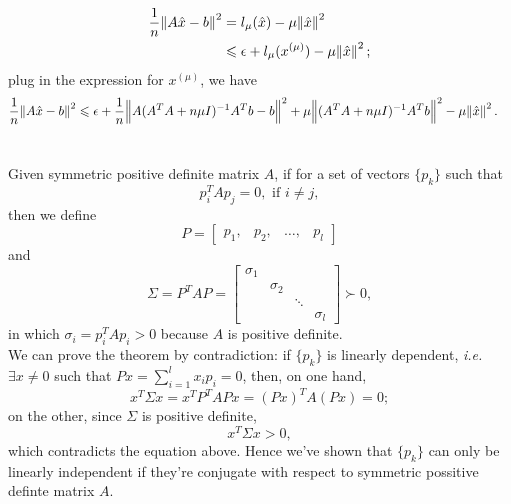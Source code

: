 \documentclass[11pt]{article}
\begin{document}
\subsection{}
\begin{equation}\begin{split}
\frac1n\norm{A\hat x-b}^2 &= l_{\mu}(\hat x)-\mu\norm{\hat x}^2 \\
&\leqslant \epsilon+l_{\mu}(x^{(\mu)})- \mu\norm{\hat x}^2;
\end{split}\nonumber\end{equation}
plug in the expression for $x^{(\mu)}$, we have
\begin{equation}\begin{split} 
\frac1n\norm{A\hat x - b}^2 &\leqslant \epsilon +\frac1n \norm{A(A^TA+n\mu I)^{-1}A^Tb-b}^2+\mu\norm{(A^TA+n\mu I)^{-1}A^Tb}^2-\mu\norm{\hat x}^2.
\end{split}\nonumber\end{equation} 


\section{}
Given symmetric positive definite matrix $A$, if for a set of vectors $\{p_k\}$ such that
$$p_i^TAp_j=0,\,\,\text{if}\,\,i\neq j,$$
then we define
$$P = \begin{bmatrix} p_1, & p_2, & \dots ,& p_l\end{bmatrix} $$
and
$$\Sigma = P^TAP = \begin{bmatrix} \sigma_1 \\ & \sigma_2 \\ & & \ddots \\ & & & \sigma_l \end{bmatrix}\succ0, $$
in which $\sigma_i = p_i^TAp_i > 0$ because $A$ is positive definite.\\[0.4cm]
We can prove the theorem by contradiction: if $\{p_k\}$ is linearly dependent, \textit{i.e.} $\exists x \neq 0$ such that $Px = \sum_{i=1}^lx_ip_i=0$, then, on one hand, 
\begin{equation} 
x^T\Sigma x = x^TP^TAPx = (Px)^TA(Px) = 0;
\nonumber\end{equation} 
on the other, since $\Sigma$ is positive definite, 
$$x^T\Sigma x > 0,$$
which contradicts the equation above. Hence we've shown that $\{p_k\}$ can only be linearly independent if they're conjugate with respect to symmetric possitive definte matrix $A$.
\end{document}
